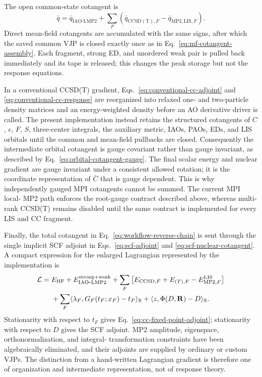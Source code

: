 \documentclass[11pt]{article}
\begin{document}
The open common-state cotangent is
\begin{equation}
 \bar q=\bar q_{\mathrm{IAO\mbox{-}LMP2}}
 +\sum_F\left(
   \bar q_{\mathrm{CCSD(T)},F}
   -\bar q_{\mathrm{MP2,LIS},F}\right).
 \label{eq:cc-common-cotangent}
\end{equation}
Direct mean-field cotangents are accumulated with the same signs, after
which the saved common VJP is closed exactly once as in
Eq.~\eqref{eq:mf-cotangent-assembly}.  Each fragment, strong ED, and unordered
weak pair is pulled back immediately and its tape is released; this changes
the peak storage but not the response equations.

In a conventional CCSD(T) gradient, Eqs.~\eqref{eq:conventional-cc-adjoint}
and \eqref{eq:conventional-cc-response} are reorganized into relaxed one- and
two-particle density matrices and an energy-weighted density before an AO
derivative driver is called.  The present implementation instead retains the
structured cotangents of $C$, $\epsilon$, $F$, $S$, three-center integrals,
the auxiliary metric, IAOs, PAOs, EDs, and LIS orbitals until the common and
mean-field pullbacks are closed.  Consequently the intermediate orbital
cotangent is gauge covariant rather than gauge invariant, as described by
Eq.~\eqref{eq:orbital-cotangent-gauge}.  The final scalar energy and nuclear
gradient are gauge invariant under a consistent allowed rotation; it is the
coordinate representation of $\bar C$ that is gauge dependent.  This is why
independently gauged MPI cotangents cannot be summed.  The current MPI local-
MP2 path enforces the root-gauge contract described above, whereas
multi-rank CCSD(T) remains disabled until the same contract is implemented
for every LIS and CC fragment.

Finally, the total cotangent in Eq.~\eqref{eq:workflow-reverse-chain} is sent
through the single implicit SCF adjoint in Eqs.~\eqref{eq:scf-adjoint} and
\eqref{eq:scf-nuclear-cotangent}.  A compact expression for the enlarged
Lagrangian represented by the implementation is
\begin{align}
 \mathcal L={}&E_{\mathrm{HF}}
 +E_{\mathrm{IAO\mbox{-}LMP2}}^{\mathrm{strong+weak}}
 +\sum_F\left[E_{\mathrm{CCSD},F}+E_{(T),F}
              -E_{\mathrm{MP2},F}^{\mathrm{LIS}}\right]
 \notag\\
 &+\sum_F\langle\lambda_F,G_F(t_F;x_F)-t_F\rangle_{\mathbb R}
 +\langle z,\Phi(D,\mathbf R)-D\rangle_{\mathbb R}.
 \label{eq:enlarged-ad-lagrangian}
\end{align}
Stationarity with respect to $t_F$ gives
Eq.~\eqref{eq:cc-fixed-point-adjoint}; stationarity with respect to $D$ gives
the SCF adjoint.  MP2 amplitude, eigenspace, orthonormalization, and integral-
transformation constraints have been algebraically eliminated, and their
adjoints are supplied by ordinary or custom VJPs.  The distinction from a
hand-written Lagrangian gradient is therefore one of organization and
intermediate representation, not of response theory.
\end{document}
